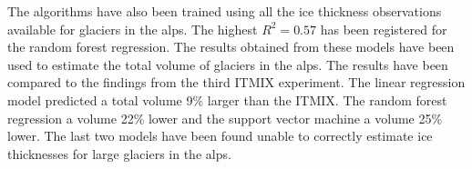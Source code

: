 The algorithms have also been trained using all the ice thickness observations available for glaciers in the alps. The highest $R^2=0.57$ has been registered for the random forest regression. The results obtained from these models have been used to estimate the total volume of glaciers in the alps. The results have been compared to the findings from the third ITMIX experiment. The linear regression model predicted a total volume 9\% larger than the ITMIX. The random forest regression a volume 22\% lower and the support vector machine a volume 25\% lower. The last two models have been found unable to correctly estimate ice thicknesses for large glaciers in the alps.   
%
%

